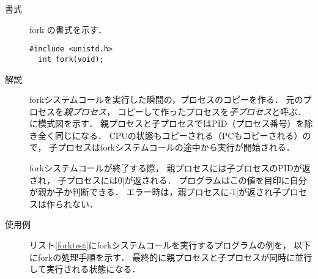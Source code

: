 \begin{description}
\item[書式] fork の書式を示す．
\begin{lstlisting}[numbers=none]
  #include <unistd.h>
  int fork(void);
\end{lstlisting}

\item[解説] forkシステムコールを実行した瞬間の，プロセスのコピーを作る．
  元のプロセスを\emph{親プロセス}，
  コピーして作ったプロセスを\emph{子プロセス}と呼ぶ．
  に模式図を示す．
  親プロセスと子プロセスではPID（プロセス番号）を除き全く同じになる．
  CPUの状態もコピーされる（PCもコピーされる）ので，
  子プロセスはforkシステムコールの途中から実行が開始される．


  forkシステムコールが終了する際，
  親プロセスには子プロセスのPIDが返され，
  子プロセスには\|0|が返される．
  プログラムはこの値を目印に自分が親か子か判断できる．
  エラー時は，親プロセスに\|-1|が返され子プロセスは作られない．

\item[使用例]
  リスト\ref{forktest}にforkシステムコールを実行するプログラムの例を，
  以下にforkの処理手順を示す．
  最終的に親プロセスと子プロセスが同時に並行して実行される状態になる．

  
  

\end{description}
